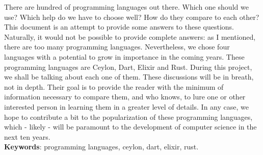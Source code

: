 \documentclass{abnt}
\begin{document}





 

\capa
\folhaderosto

\begin{resumo}
There are hundred of programming languages out there. Which one should we use?
Which help do we have to choose well? How do they compare to each other? This
document is an attempt to provide some answers to these questions. Naturally, it
would not be possible to provide complete answers: as I mentioned, there are too
many programming languages. Nevertheless, we chose four languages with a
potential to grow in importance in the coming years. These programming languages
are Ceylon, Dart, Elixir and Rust. During this project, we shall be
talking about each one of them. These discussions will be in breath, not in
depth. Their goal is to provide the reader with the minimum of information
necessary to compare them, and who knows, to lure one or other interested person
in learning them in a greater level of details. In any case, we hope to
contribute a bit to the popularization of these programming languages, which -
likely - will be paramount to the development of computer science in the next
ten years.\\


\textbf{Keywords}: programming languages, ceylon, dart, elixir, rust.
\end{resumo}

\sumario %
\listoffigures %


\end{document}
